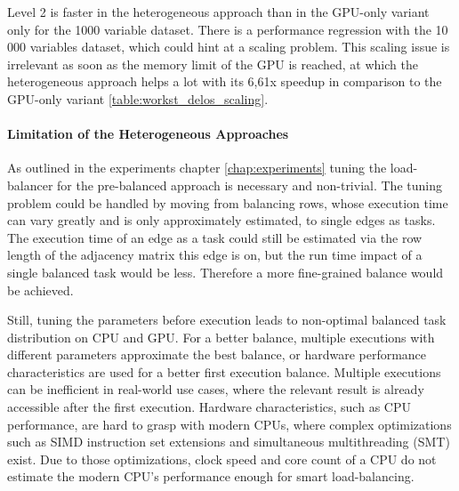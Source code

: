 Level 2 is faster in the heterogeneous approach than in the GPU-only variant only for the 1000 variable dataset. There is a performance regression with the 10 000 variables dataset, which could hint at a scaling problem.
This scaling issue is irrelevant as soon as the memory limit of the GPU is reached, at which the heterogeneous approach helps a lot with its 6,61x speedup in comparison to the GPU-only variant \ref{table:workst_delos_scaling}.


\paragraph{Limitation of the Heterogeneous Approaches}

As outlined in the experiments chapter \ref{chap:experiments} tuning the load-balancer for the pre-balanced approach is necessary and non-trivial. The tuning problem could be handled by moving from balancing rows, whose execution time can vary greatly and is only approximately estimated, to single edges as tasks. The execution time of an edge as a task could still be estimated via the row length of the adjacency matrix this edge is on, but the run time impact of a single balanced task would be less. Therefore a more fine-grained balance would be achieved.

Still, tuning the parameters before execution leads to non-optimal balanced task distribution on CPU and GPU. For a better balance, multiple executions with different parameters approximate the best balance, or hardware performance characteristics are used for a better first execution balance. Multiple executions can be inefficient in real-world use cases, where the relevant result is already accessible after the first execution. Hardware characteristics, such as CPU performance, are hard to grasp with modern CPUs, where complex optimizations such as SIMD instruction set extensions and simultaneous multithreading (SMT) exist. Due to those optimizations, clock speed and core count of a CPU do not estimate the modern CPU's performance enough for smart load-balancing.

